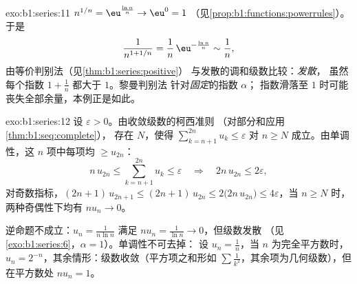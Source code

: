 \begin{solution}{exo:b1:series:11}
$n^{1/n} = \eu^{\frac{\ln n}{n}} \to \eu^0 = 1$
（见\cref{prop:b1:functions:powerrules}）。于是
\[
\frac{1}{n^{1 + 1/n}} = \frac{1}{n}\,\eu^{-\frac{\ln n}{n}}
\sim \frac{1}{n} ,
\]
由等价判别法（见\cref{thm:b1:series:positive}）
与发散的调和级数比较：\emph{发散}，
虽然每个指数 $1 + \frac1n$ 都大于 $1$。黎曼判别法
针对\emph{固定}的指数 $\alpha$；
指数滑落至 $1$ 时可能丧失全部余量，本例正是如此。
\end{solution}

\begin{solution}{exo:b1:series:12}
设 $\varepsilon > 0$。由收敛级数的柯西准则
（对部分和应用\cref{thm:b1:seq:complete}），
存在 $N$，使得 $\sum_{k=n+1}^{2n} u_k \leq
\varepsilon$ 对 $n \geq N$ 成立。由单调性，这 $n$ 项中每项均
$\geq u_{2n}$：
\[
n\,u_{2n} \leq \sum_{k=n+1}^{2n} u_k \leq \varepsilon
\quad\Longrightarrow\quad 2n\,u_{2n} \leq 2\varepsilon ,
\]
对奇数指标，$(2n+1)\,u_{2n+1} \leq (2n+1)\,u_{2n} \leq
2\bigl(2n\,u_{2n}\bigr) \leq 4\varepsilon$，当 $n \geq N$ 时，
两种奇偶性下均有 $n u_n \to 0$。

逆命题不成立：$u_n = \frac{1}{n\ln n}$ 满足 $n u_n =
\frac{1}{\ln n} \to 0$，但级数发散
（见\cref{exo:b1:series:6}，$\alpha = 1$）。单调性不可去掉：
设 $u_n = \frac1n$，当 $n$ 为完全平方数时，$u_n =
2^{-n}$，其余情形：级数收敛（平方项之和形如
$\sum \frac{1}{k^2}$，其余项为几何级数），但在平方数处 $n u_n =
1$。
\end{solution}

